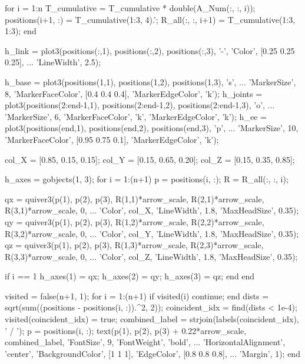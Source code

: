 \documentclass[11pt, a4paper]{article}
\begin{document}
\begin{matlabcode}
for i = 1:n
    T_cumulative = T_cumulative * double(A_Num(:, :, i));
    positions(i+1, :) = T_cumulative(1:3, 4).';
    R_all(:, :, i+1)  = T_cumulative(1:3, 1:3);
end

h_link = plot3(positions(:,1), positions(:,2), positions(:,3), '-', 'Color', [0.25 0.25 0.25], ...
    'LineWidth', 2.5);

h_base = plot3(positions(1,1), positions(1,2), positions(1,3), 's', ...
    'MarkerSize', 8, 'MarkerFaceColor', [0.4 0.4 0.4], 'MarkerEdgeColor', 'k');
h_joints = plot3(positions(2:end-1,1), positions(2:end-1,2), positions(2:end-1,3), 'o', ...
    'MarkerSize', 6, 'MarkerFaceColor', 'k', 'MarkerEdgeColor', 'k');
h_ee = plot3(positions(end,1), positions(end,2), positions(end,3), 'p', ...
    'MarkerSize', 10, 'MarkerFaceColor', [0.95 0.75 0.1], 'MarkerEdgeColor', 'k');

col_X = [0.85, 0.15, 0.15];
col_Y = [0.15, 0.65, 0.20];
col_Z = [0.15, 0.35, 0.85];

h_axes = gobjects(1, 3);
for i = 1:(n+1)
    p = positions(i, :);
    R = R_all(:, :, i);

    qx = quiver3(p(1), p(2), p(3), R(1,1)*arrow_scale, R(2,1)*arrow_scale, R(3,1)*arrow_scale, 0, ...
        'Color', col_X, 'LineWidth', 1.8, 'MaxHeadSize', 0.35);
    qy = quiver3(p(1), p(2), p(3), R(1,2)*arrow_scale, R(2,2)*arrow_scale, R(3,2)*arrow_scale, 0, ...
        'Color', col_Y, 'LineWidth', 1.8, 'MaxHeadSize', 0.35);
    qz = quiver3(p(1), p(2), p(3), R(1,3)*arrow_scale, R(2,3)*arrow_scale, R(3,3)*arrow_scale, 0, ...
        'Color', col_Z, 'LineWidth', 1.8, 'MaxHeadSize', 0.35);

    if i == 1
        h_axes(1) = qx;
        h_axes(2) = qy;
        h_axes(3) = qz;
    end
end

visited = false(n+1, 1);
for i = 1:(n+1)
    if visited(i)
        continue;
    end
    dists = sqrt(sum((positions - positions(i, :)).^2, 2));
    coincident_idx = find(dists < 1e-4);
    visited(coincident_idx) = true;
    combined_label = strjoin(labels(coincident_idx), ' / ');
    p = positions(i, :);
    text(p(1), p(2), p(3) + 0.22*arrow_scale, combined_label, 'FontSize', 9, 'FontWeight', 'bold', ...
        'HorizontalAlignment', 'center', 'BackgroundColor', [1 1 1], 'EdgeColor', [0.8 0.8 0.8], ...
        'Margin', 1);
end
\end{matlabcode}
\end{document}
